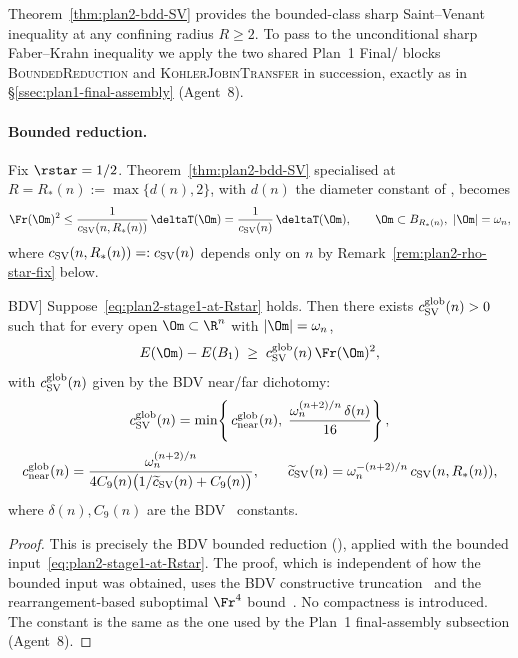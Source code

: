 Theorem~\ref{thm:plan2-bdd-SV} provides the bounded-class sharp
Saint--Venant inequality at any confining radius $R\ge 2$. To pass to
the unconditional sharp Faber--Krahn inequality we apply the two
shared Plan~1 Final/ blocks \textsc{BoundedReduction} and
\textsc{KohlerJobinTransfer} in succession, exactly as in
\S\ref{ssec:plan1-final-assembly} (Agent~8).

\paragraph{Bounded reduction.}
Fix $\rstar=1/2$. Theorem~\ref{thm:plan2-bdd-SV} specialised at
$R=R_*(n):=\max\{d(n),2\}$, with $d(n)$ the diameter constant of
\cite[Lemma~5.3]{BDV}, becomes
\begin{equation}\label{eq:plan2-stage1-at-Rstar}
   \Fr(\Om)^{2}\le \frac{1}{c_{\rm SV}(n,R_*(n))}\,\deltaT(\Om)
   =\frac{1}{c_{\rm SV}(n)}\,\deltaT(\Om),
   \qquad \Om\subset B_{R_*(n)},\ |\Om|=\omega_n,
\end{equation}
where $c_{\rm SV}(n,R_*(n))=:c_{\rm SV}(n)$ depends only on $n$ by
Remark~\ref{rem:plan2-rho-star-fix} below.

\begin{theorem}[Global sharp Saint--Venant; cf.\
\cite[Theorem~5.4 (BDV bounded reduction)]{BDV}]
\label{thm:plan2-glob-SV}
Suppose~\eqref{eq:plan2-stage1-at-Rstar} holds. Then there exists
$c_{\rm SV}^{\rm glob}(n)>0$ such that for every open
$\Om\subset\R^n$ with $|\Om|=\omega_n$,
\begin{equation}\label{eq:plan2-glob-SV}
   E(\Om)-E(B_1)\;\ge\;c_{\rm SV}^{\rm glob}(n)\,\Fr(\Om)^{2},
\end{equation}
with $c_{\rm SV}^{\rm glob}(n)$ given by the BDV near/far dichotomy:
\begin{equation}\label{eq:plan2-cSVglob}
   c_{\rm SV}^{\rm glob}(n)
   =\min\!\left\{\,
       c_{\rm near}^{\rm glob}(n),\;
       \frac{\omega_n^{(n+2)/n}\,\delta(n)}{16}\right\},
\end{equation}
\[
   c_{\rm near}^{\rm glob}(n)
   =\frac{\omega_n^{(n+2)/n}}{4C_9(n)\bigl(1/\widetilde c_{\rm SV}(n)+C_9(n)\bigr)},
   \qquad
   \widetilde c_{\rm SV}(n)=\omega_n^{-(n+2)/n}\,c_{\rm SV}(n,R_*(n)),
\]
where $\delta(n),C_9(n)$ are the BDV~\cite[Lemmas 5.1--5.3]{BDV}
constants.
\end{theorem}

\begin{proof}
This is precisely the BDV bounded reduction
(\cite[Lemmas~5.1--5.3 and the proof of Theorem~1.5]{BDV}), applied
with the bounded input~\eqref{eq:plan2-stage1-at-Rstar}. The proof,
which is independent of how the bounded input was obtained, uses
the BDV constructive truncation~\cite[Lemma~5.3]{BDV}
and the rearrangement-based suboptimal $\Fr^{4}$
bound~\cite[Lemma~5.2]{BDV}. No compactness is
introduced. The constant is the same as the one used by the Plan~1
final-assembly subsection (Agent~8).
\end{proof}

